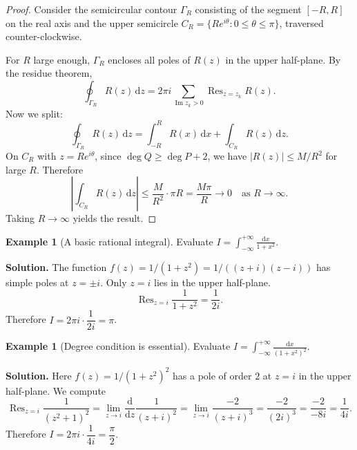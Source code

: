 \documentclass[12pt,a4paper,openany]{book}
\theoremstyle{definition}
\newtheorem{example}[definition]{Example}
\theoremstyle{plain}
\theoremstyle{remark}
\DeclareMathOperator{\re}{Re}
\DeclareMathOperator{\im}{Im}
\DeclareMathOperator{\Res}{Res}
\newcommand{\dd}{\mathrm{d}}
\newcommand{\abs}[1]{\left|#1\right|}
\begin{document}
\begin{proof}
Consider the semicircular contour $\Gamma_R$ consisting of the segment
$[-R,R]$ on the real axis and the upper semicircle
$C_R=\{Re^{i\theta}:0\leq\theta\leq\pi\}$, traversed counter-clockwise.

\begin{center}
\end{center}

For $R$ large enough, $\Gamma_R$ encloses all poles of $R(z)$ in the
upper half-plane.  By the residue theorem,
\[
  \oint_{\Gamma_R}R(z)\,\dd z
  =2\pi i\sum_{\im z_k>0}\Res_{z=z_k}R(z).
\]
Now we split:
\[
  \oint_{\Gamma_R}R(z)\,\dd z
  =\int_{-R}^{R}R(x)\,\dd x+\int_{C_R}R(z)\,\dd z.
\]
On $C_R$ with $z=Re^{i\theta}$, since $\deg Q\geq\deg P+2$, we have
$\abs{R(z)}\leq M/R^2$ for large $R$.  Therefore
\[
  \left|\int_{C_R}R(z)\,\dd z\right|\leq\frac{M}{R^2}\cdot\pi R
  =\frac{M\pi}{R}\to 0\quad\text{as }R\to\infty.
\]
Taking $R\to\infty$ yields the result.
\end{proof}

\begin{example}[A basic rational integral]\label{ex:rational-1}
Evaluate $\displaystyle I=\int_{-\infty}^{+\infty}\frac{\dd x}{1+x^2}$.

\medskip\noindent\textbf{Solution.}
The function $f(z)=1/(1+z^2)=1/((z+i)(z-i))$ has simple poles at
$z=\pm i$.  Only $z=i$ lies in the upper half-plane.
\[
  \Res_{z=i}\frac{1}{1+z^2}=\frac{1}{2i}.
\]
Therefore $I=2\pi i\cdot\dfrac{1}{2i}=\pi$.
\end{example}

\begin{example}[Degree condition is essential]\label{ex:rational-2}
Evaluate $\displaystyle I=\int_{-\infty}^{+\infty}\frac{\dd x}{(1+x^2)^2}$.

\medskip\noindent\textbf{Solution.}
Here $f(z)=1/(1+z^2)^2$ has a pole of order $2$ at $z=i$ in the upper
half-plane.  We compute
\[
  \Res_{z=i}\frac{1}{(z^2+1)^2}
  =\lim_{z\to i}\frac{\dd}{\dd z}\frac{1}{(z+i)^2}
  =\lim_{z\to i}\frac{-2}{(z+i)^3}
  =\frac{-2}{(2i)^3}=\frac{-2}{-8i}=\frac{1}{4i}.
\]
Therefore $I=2\pi i\cdot\dfrac{1}{4i}=\dfrac{\pi}{2}$.
\end{example}
\end{document}
